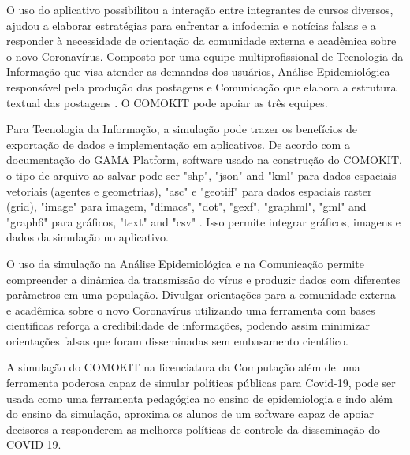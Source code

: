 O uso do aplicativo possibilitou a interação entre integrantes de cursos diversos, ajudou a elaborar estratégias para enfrentar a infodemia e notícias falsas e a responder à necessidade de orientação da comunidade externa e acadêmica sobre o novo Coronavírus. Composto por uma equipe multiprofissional de Tecnologia da Informação que visa atender as demandas dos usuários, Análise Epidemiológica responsável pela produção das postagens e Comunicação que elabora a estrutura textual das postagens \cite{oliveira2021equipe}. O COMOKIT pode apoiar as três equipes.

Para Tecnologia da Informação, a simulação pode trazer os benefícios de exportação de dados e implementação em aplicativos. De acordo com a documentação do GAMA Platform, software usado na construção do COMOKIT, o tipo de arquivo ao salvar pode ser "shp", "json" and "kml" para dados espaciais vetoriais (agentes e geometrias), "asc" e "geotiff" para dados espaciais raster (grid), "image" para imagem, "dimacs", "dot", "gexf", "graphml", "gml" and "graph6" para gráficos, "text" and "csv" \cite{GamaWiki:online}. Isso permite integrar gráficos, imagens e dados da simulação no aplicativo.

O uso da simulação na Análise Epidemiológica e na Comunicação permite compreender a dinâmica da transmissão do vírus e produzir dados com diferentes parâmetros em uma população. Divulgar orientações para a comunidade externa e acadêmica sobre o novo Coronavírus utilizando uma ferramenta com bases cientificas reforça a credibilidade de informações, podendo assim minimizar orientações falsas que foram disseminadas sem embasamento científico.

A simulação do COMOKIT na licenciatura da Computação além de uma ferramenta poderosa capaz de simular políticas públicas para Covid-19, pode ser usada como uma ferramenta pedagógica no ensino de epidemiologia e indo além do ensino da simulação, aproxima os alunos de um software capaz de apoiar decisores a responderem as melhores políticas de controle da disseminação do COVID-19.











